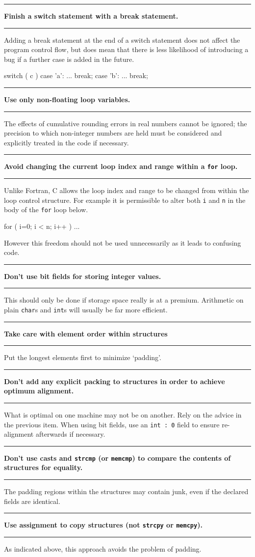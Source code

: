 \documentclass[twoside,11pt,nolof,noabs]{starlink}
\newcounter{sruleno}
\newcommand{\srule}[1]{
    \addtocounter{sruleno}{1}
    \goodbreak
    \rule{\textwidth}{0.3mm}
    \textbf{#1} \scpushright{\textbf{\thesruleno}}
    \rule{\textwidth}{0.1mm}
}
\begin{document}
\srule{Finish a switch statement with a break statement.}
Adding a break statement at the end of a switch statement does not
affect the program control flow, but does mean that there
is less likelihood of introducing a bug if a further case is added
in the future.
\begin{terminalv}
      switch ( c ) {
         case 'a':
            ...
            break;
         case 'b':
            ...
            break;
      }
\end{terminalv}


\srule{Use only non-floating loop variables.}
The effects of cumulative rounding errors in real numbers cannot be ignored;
the precision to which non-integer numbers are held must be considered and
explicitly treated in the code if necessary.


\srule{Avoid changing the current loop index and range within a
\texttt{for} loop.}
Unlike Fortran, C allows the loop index  and range to be changed
from within the loop control structure.
For example it is permissible to alter both \texttt{i} and \texttt{n}
in the body of the \texttt{for} loop below.
\begin{terminalv}
      for ( i=0; i < n; i++ )
      {
         ...
      }
\end{terminalv}
However this freedom should not be used unnecessarily as it leads to
confusing code.



\srule{Don't use bit fields for storing integer values.}
This should only be done if storage space
really is at a premium. Arithmetic on plain \verb~char~s and
\verb~int~s will usually be far more efficient.

\srule{Take care with element order within structures}
Put the longest elements first to minimize `padding'.

\srule{Don't add any explicit packing to structures in order to achieve optimum
alignment.}
What is optimal on one machine may not be on another. Rely
on the advice in the previous item.
When using bit fields, use an \texttt{int~:~0}
field to ensure re-alignment afterwards if necessary.



\srule{Don't use casts and \texttt{strcmp} (or \texttt{memcmp}) to compare the contents of
structures for equality.}
The padding regions within the structures may
contain junk, even if the declared fields are identical.

\srule{Use assignment to copy structures (not \texttt{strcpy} or \texttt{memcpy}).}
As indicated above, this approach avoids the problem of padding.
\end{document}
